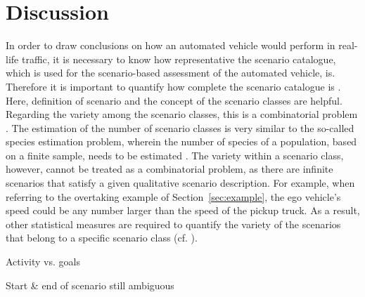 \section{Discussion}
\label{sec:discussion}

In order to draw conclusions on how an automated vehicle would perform in real-life traffic, it is necessary to know how representative the scenario catalogue, which is used for the scenario-based assessment of the automated vehicle, is. Therefore it is important to quantify how complete the scenario catalogue is \cite{geyer2014, alvarez2017prospective, stellet2015taxonomy}. Here, definition of scenario and the concept of the scenario classes are helpful. Regarding the variety among the scenario classes, this is a combinatorial problem \cite{geyer2014}. The estimation of the number of scenario classes is very similar to the so-called species estimation problem, wherein the number of species of a population, based on a finite sample, needs to be estimated \cite{yang2012estimating, bunge1993estimating}. The variety within a scenario class, however, cannot be treated as a combinatorial problem, as there are infinite scenarios that satisfy a given qualitative scenario description. For example, when referring to the overtaking example of Section~\ref{sec:example}, the ego vehicle's speed could be any number larger than the speed of the pickup truck. As a result, other statistical measures are required to quantify the variety of the scenarios that belong to a specific scenario class (cf. \cite{wang2017much}).

\color{red}

Activity vs. goals

Start \& end of scenario still ambiguous

\color{black}